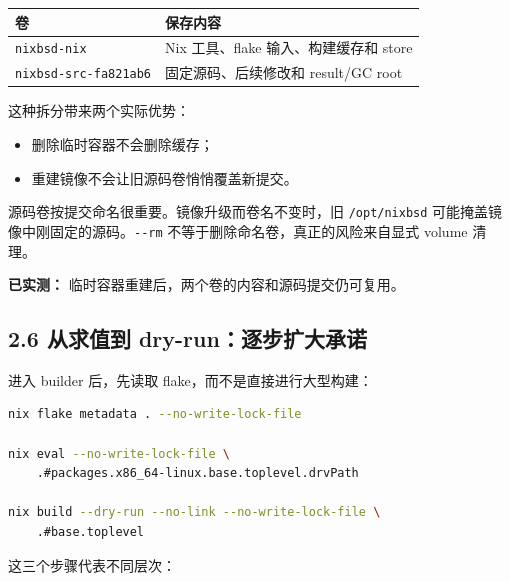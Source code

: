 \documentclass[
  11pt,
  UTF8,
  a4paper,
  fontset=fandol]{ctexart}
\newcommand{\passthrough}[1]{#1}
\providecommand{\tightlist}{%
  \setlength{\itemsep}{0pt}\setlength{\parskip}{0pt}}
\begin{document}
\begin{longtable}[]{@{}
  >{\raggedright\arraybackslash}p{}
  >{\raggedright\arraybackslash}p{}@{}}
\toprule\noalign{}
\begin{minipage}[b]{\linewidth}\raggedright
卷
\end{minipage} & \begin{minipage}[b]{\linewidth}\raggedright
保存内容
\end{minipage} \\
\midrule\noalign{}
\endhead
\bottomrule\noalign{}
\endlastfoot
\passthrough{\lstinline!nixbsd-nix!} & Nix 工具、flake 输入、构建缓存和
store \\
\passthrough{\lstinline!nixbsd-src-fa821ab6!} & 固定源码、后续修改和
result/GC root \\
\end{longtable}

这种拆分带来两个实际优势：

\begin{itemize}
\tightlist
\item
  删除临时容器不会删除缓存；
\item
  重建镜像不会让旧源码卷悄悄覆盖新提交。
\end{itemize}

源码卷按提交命名很重要。镜像升级而卷名不变时，旧
\passthrough{\lstinline!/opt/nixbsd!}
可能掩盖镜像中刚固定的源码。\passthrough{\lstinline!--rm!}
不等于删除命名卷，真正的风险来自显式 volume 清理。

\textbf{已实测：} 临时容器重建后，两个卷的内容和源码提交仍可复用。

\subsection{2.6 从求值到
dry-run：逐步扩大承诺}\label{ux4eceux6c42ux503cux5230-dry-runux9010ux6b65ux6269ux5927ux627fux8bfa}

进入 builder 后，先读取 flake，而不是直接进行大型构建：

\begin{lstlisting}[language=sh]
nix flake metadata . --no-write-lock-file

nix eval --no-write-lock-file \
    .#packages.x86_64-linux.base.toplevel.drvPath

nix build --dry-run --no-link --no-write-lock-file \
    .#base.toplevel
\end{lstlisting}

这三个步骤代表不同层次：
\end{document}

